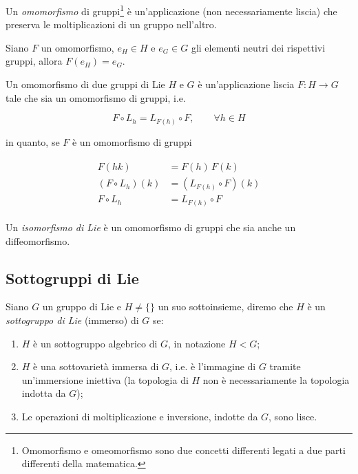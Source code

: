Un \textit{omomorfismo} di gruppi\footnote{%
	Omomorfismo e omeomorfismo sono due concetti differenti legati a due parti differenti della matematica.%
} è un'applicazione (non necessariamente liscia) che preserva le moltiplicazioni di un gruppo nell'altro.

\begin{remark}
Siano $ F $ un omomorfismo, $ e_{H} \in H $ e $ e_{G} \in G $ gli elementi neutri dei rispettivi gruppi, allora $ F(e_{H}) = e_{G} $.
\end{remark}

Un omomorfismo di due gruppi di Lie $ H $ e $ G $ è un'applicazione liscia $ F : H \to G $ tale che sia un omomorfismo di gruppi, i.e.

\begin{equation}
	F \circ L_{h} = L_{F(h)} \circ F, \qquad \forall h \in H
\end{equation}

in quanto, se $ F $ è un omomorfismo di gruppi

\begin{align}
	\begin{split}
		F(h k) &= F(h) \, F(k)\\
		(F \circ L_{h})(k) &= (L_{F(h)} \circ F)(k)\\
		F \circ L_{h} &= L_{F(h)} \circ F
	\end{split}
\end{align}

Un \textit{isomorfismo di Lie} è un omomorfismo di gruppi che sia anche un diffeomorfismo.

\subsection{Sottogruppi di Lie}

Siano $ G $ un gruppo di Lie e $ H \neq \{\} $ un suo sottoinsieme, diremo che $ H $ è un \textit{sottogruppo di Lie} (immerso) di $ G $ se:

\begin{enumerate}
	\item $ H $ è un sottogruppo algebrico di $ G $, in notazione $ H < G $;
	
	\item $ H $ è una sottovarietà immersa di $ G $, i.e. è l'immagine di $ G $ tramite un'immersione iniettiva (la topologia di $ H $ non è necessariamente la topologia indotta da $ G $);
	
	\item Le operazioni di moltiplicazione e inversione, indotte da $ G $, sono lisce.
\end{enumerate}

